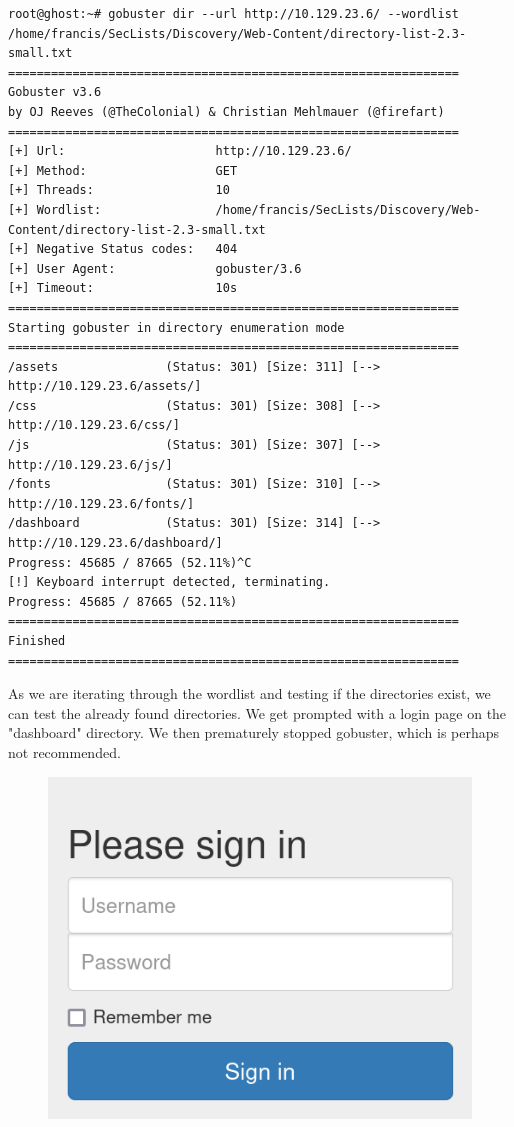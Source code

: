 \documentclass[conference]{IEEEtran}
\begin{document}
\begin{scriptsize}
\begin{verbatim}
root@ghost:~# gobuster dir --url http://10.129.23.6/ --wordlist /home/francis/SecLists/Discovery/Web-Content/directory-list-2.3-small.txt
===============================================================
Gobuster v3.6
by OJ Reeves (@TheColonial) & Christian Mehlmauer (@firefart)
===============================================================
[+] Url:                     http://10.129.23.6/
[+] Method:                  GET
[+] Threads:                 10
[+] Wordlist:                /home/francis/SecLists/Discovery/Web-Content/directory-list-2.3-small.txt
[+] Negative Status codes:   404
[+] User Agent:              gobuster/3.6
[+] Timeout:                 10s
===============================================================
Starting gobuster in directory enumeration mode
===============================================================
/assets               (Status: 301) [Size: 311] [--> http://10.129.23.6/assets/]
/css                  (Status: 301) [Size: 308] [--> http://10.129.23.6/css/]
/js                   (Status: 301) [Size: 307] [--> http://10.129.23.6/js/]
/fonts                (Status: 301) [Size: 310] [--> http://10.129.23.6/fonts/]
/dashboard            (Status: 301) [Size: 314] [--> http://10.129.23.6/dashboard/]
Progress: 45685 / 87665 (52.11%)^C
[!] Keyboard interrupt detected, terminating.
Progress: 45685 / 87665 (52.11%)
===============================================================
Finished
===============================================================
\end{verbatim}
\end{scriptsize}

As we are iterating through the wordlist and testing if the directories exist, we can test the already found directories. We get prompted with a login page on the "dashboard" directory.
We then prematurely stopped gobuster, which is perhaps not recommended.

\begin{figure}[htb]
\includegraphics[scale=0.3]{login.png}
\centering
\end{figure}
\end{document}
